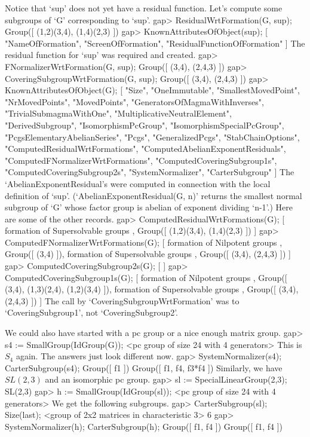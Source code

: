 Notice that `sup' does not yet have a residual function.
 Let's compute some subgroups of `G' corresponding to `sup'.
\beginexample
gap> ResidualWrtFormation(G, sup);
Group([ (1,2)(3,4), (1,4)(2,3) ])
gap> KnownAttributesOfObject(sup);
[ "NameOfFormation", "ScreenOfFormation", "ResidualFunctionOfFormation" ]
\endexample
 The residual function for `sup' was required and created.
\beginexample
gap> FNormalizerWrtFormation(G, sup);
Group([ (3,4), (2,4,3) ])
gap> CoveringSubgroupWrtFormation(G, sup);
Group([ (3,4), (2,4,3) ])
gap> KnownAttributesOfObject(G);
[ "Size", "OneImmutable", "SmallestMovedPoint", "NrMovedPoints", 
  "MovedPoints", "GeneratorsOfMagmaWithInverses", "TrivialSubmagmaWithOne", 
  "MultiplicativeNeutralElement", "DerivedSubgroup", "IsomorphismPcGroup", 
  "IsomorphismSpecialPcGroup", "PcgsElementaryAbelianSeries", "Pcgs", 
  "GeneralizedPcgs", "StabChainOptions", "ComputedResidualWrtFormations", 
  "ComputedAbelianExponentResiduals", "ComputedFNormalizerWrtFormations", 
  "ComputedCoveringSubgroup1s", "ComputedCoveringSubgroup2s", 
  "SystemNormalizer", "CarterSubgroup" ]
\endexample
 The `AbelianExponentResidual's were computed in connection with the
local definition of `sup'. (`AbelianExponentResidual(G, n)' returns
the smallest normal subgroup of `G' whose factor group is abelian of
exponent dividing `n-1'.) Here are some of the other records.
\beginexample
gap> ComputedResidualWrtFormations(G);
[ formation of Supersolvable groups , Group([ (1,2)(3,4), (1,4)(2,3) ]) ]
gap> ComputedFNormalizerWrtFormations(G);
[ formation of Nilpotent groups , Group([ (3,4) ]), 
  formation of Supersolvable groups , Group([ (3,4), (2,4,3) ]) ]
gap> ComputedCoveringSubgroup2s(G);
[  ]
gap> ComputedCoveringSubgroup1s(G);
[ formation of Nilpotent groups , Group([ (3,4), (1,3)(2,4), (1,2)(3,4) ]), 
  formation of Supersolvable groups , Group([ (3,4), (2,4,3) ]) ]
\endexample
The call by `CoveringSubgroupWrtFormation' was to `CoveringSubgroup1', not
`CoveringSubgroup2'.

We could also have started with a pc group or a nice enough matrix group.
\beginexample
gap> s4 := SmallGroup(IdGroup(G));
<pc group of size 24 with 4 generators>
\endexample
This is $S_4$ again. The answers just look different now.
\beginexample
gap> SystemNormalizer(s4); CarterSubgroup(s4);
Group([ f1 ])
Group([ f1, f4, f3*f4 ])
\endexample
Similarly, we have $SL(2,3)$ and an isomorphic pc group.
\beginexample
gap> sl := SpecialLinearGroup(2,3);
SL(2,3)
gap> h := SmallGroup(IdGroup(sl));
<pc group of size 24 with 4 generators>
\endexample
We get the following subgroups.
\beginexample
gap> CarterSubgroup(sl); Size(last);
<group of 2x2 matrices in characteristic 3>
6
gap> SystemNormalizer(h); CarterSubgroup(h);
Group([ f1, f4 ])
Group([ f1, f4 ])
\endexample

